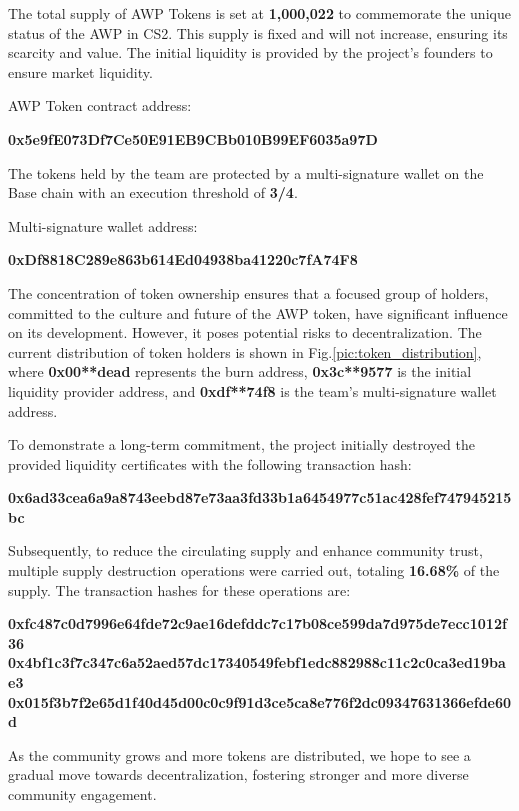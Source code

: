 \documentclass[journal,onecolumn,]{IEEEtran}
\begin{document}
	The total supply of AWP Tokens is set at \textbf{1,000,022} to commemorate the unique status of the AWP in CS2. This supply is fixed and will not increase, ensuring its scarcity and value. The initial liquidity is provided by the project's founders to ensure market liquidity.
	
	AWP Token contract address:
	\begin{center}
		\textbf{0x5e9fE073Df7Ce50E91EB9CBb010B99EF6035a97D}
	\end{center}
	
	The tokens held by the team are protected by a multi-signature wallet on the Base chain with an execution threshold of \textbf{3/4}.
	
	Multi-signature wallet address:
	\begin{center}
		\textbf{0xDf8818C289e863b614Ed04938ba41220c7fA74F8}
	\end{center}
	
	The concentration of token ownership ensures that a focused group of holders, committed to the culture and future of the AWP token, have significant influence on its development. However, it poses potential risks to decentralization. The current distribution of token holders is shown in Fig.\ref{pic:token_distribution}, where \textbf{0x00**dead} represents the burn address, \textbf{0x3c**9577} is the initial liquidity provider address, and \textbf{0xdf**74f8} is the team's multi-signature wallet address.
	
	To demonstrate a long-term commitment, the project initially destroyed the provided liquidity certificates with the following transaction hash:
	\begin{center}
		\textbf{0x6ad33cea6a9a8743eebd87e73aa3fd33b1a6454977c51ac428fef747945215bc}
	\end{center}
	
	Subsequently, to reduce the circulating supply and enhance community trust, multiple supply destruction operations were carried out, totaling \textbf{16.68\%} of the supply. The transaction hashes for these operations are:
	\begin{center}
		\textbf{0xfc487c0d7996e64fde72c9ae16defddc7c17b08ce599da7d975de7ecc1012f36}
		\textbf{0x4bf1c3f7c347c6a52aed57dc17340549febf1edc882988c11c2c0ca3ed19bae3}
		\textbf{0x015f3b7f2e65d1f40d45d00c0c9f91d3ce5ca8e776f2dc09347631366efde60d}
	\end{center}
	
	As the community grows and more tokens are distributed, we hope to see a gradual move towards decentralization, fostering stronger and more diverse community engagement.
	
\end{document}

